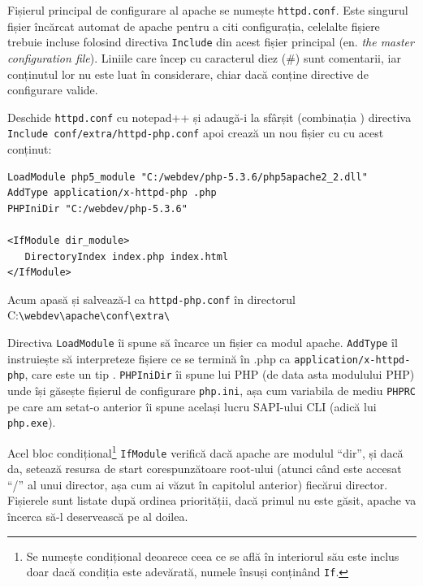 Fișierul principal de configurare  al apache se numește \texttt{httpd.conf}. Este singurul
fișier încărcat automat de apache pentru a citi configurația, celelalte fișiere
trebuie incluse folosind directiva \texttt{Include} din acest fișier
principal (en. \textsl{the master configuration file}). Liniile care încep
cu caracterul diez (\#) sunt comentarii, iar conținutul lor nu este luat
în considerare, chiar dacă conține directive de configurare valide.

Deschide \texttt{httpd.conf} cu notepad++ și adaugă-i la sfârșit
(combinația ) directiva
\texttt{Include conf/extra/httpd-php.conf}
apoi crează un nou fișier cu  cu acest conținut:
\begin{verbatim}
LoadModule php5_module "C:/webdev/php-5.3.6/php5apache2_2.dll"
AddType application/x-httpd-php .php
PHPIniDir "C:/webdev/php-5.3.6"

<IfModule dir_module>
   DirectoryIndex index.php index.html
</IfModule>
\end{verbatim}

Acum apasă  și salvează-l ca \texttt{httpd-php.conf}
în directorul
C:\texttt{{\textbackslash}webdev{\textbackslash}apache{\textbackslash}conf{\textbackslash}extra{\textbackslash}}

Directiva \texttt{LoadModule} îi spune să încarce un fișier ca modul apache. \texttt{AddType}
îl instruiește să interpreteze fișiere ce se termină în .php ca 
\texttt{application/x-httpd-php}, care este un tip 
.
\texttt{PHPIniDir} îi spune lui PHP (de data asta modulului PHP) unde își găsește fișierul
de configurare \texttt{php.ini}, așa cum variabila de mediu \texttt{PHPRC} pe care
am setat-o anterior îi spune același lucru SAPI-ului CLI (adică lui \texttt{php.exe}).

Acel bloc condițional\footnote{Se numește condițional deoarece ceea ce se află
în interiorul său este inclus doar dacă condiția este adevărată, numele însuși
conținând \texttt{If}.}
\texttt{IfModule} verifică dacă apache are modulul ``dir'', și dacă
da, setează resursa de start corespunzătoare root-ului (atunci când este accesat ``/''
al unui director, așa cum ai văzut în capitolul anterior) fiecărui director. Fișierele
sunt listate după ordinea priorității, dacă primul nu este găsit, apache va încerca să-l
deservească pe al doilea.


